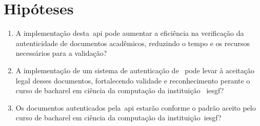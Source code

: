 \section{Hipóteses}\label{sec:hipoteses}

\begin{enumerate}[label=\alph*)]
    \item A implementação desta~\acrshort{api} pode aumentar a eficiência na
    verificação da autenticidade de documentos acadêmicos, reduzindo o tempo e
    os recursos necessários para a validação?
    \item A implementação de um sistema de autenticação de~ pode
    levar à aceitação legal desses documentos, fortalecendo validade e
    reconhecimento perante o curso de bacharel em ciência da computação da
    instituição
    ~\acrshort{iesgf}?
    \item Os documentos autenticados pela~\acrshort{api} estarão conforme o
    padrão
    aceito pelo curso de bacharel em ciência da computação da instituição~\acrshort{iesgf}?
\end{enumerate}